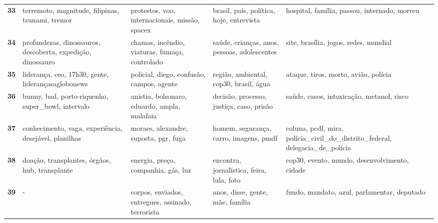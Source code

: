 \begin{xltabular}{\textwidth}{@{}l >{\RaggedRight\arraybackslash}X >{\RaggedRight\arraybackslash}X >{\RaggedRight\arraybackslash}X >{\RaggedRight\arraybackslash}X@{}}
    \textbf{33} & terremoto, magnitude, filipinas, tsunami, tremor & protestos, voo, internacionais, missão, spacex & brasil, país, política, hoje, entrevista & hospital, família, passou, internado, morreu \\
    \textbf{34} & profundezas, dinossauros, descoberta, expedição, dinossauro & chamas, incêndio, viaturas, fumaça, controlado & saúde, crianças, anos, pessoas, adolescentes & site, brasília, jogos, redes, mundial \\
    \textbf{35} & liderança, ceo, 17h30, gente, liderançasaglobonews & policial, diego, confusão, campos, agente & região, ambiental, cop30, brasil, água & ataque, tiros, morto, avião, polícia \\
    \textbf{36} & bunny, bad, porto-riquenho, super\_bowl, intervalo & anistia, bolsonaro, eduardo, ampla, malafaia & decisão, processo, justiça, caso, prisão & saúde, casos, intoxicação, metanol, risco \\
    \textbf{37} & conhecimento, vaga, experiência, desejável, planilhas & moraes, alexandre, suposta, pgr, fuga & homem, segurança, carro, imagens, pmdf & coluna, pcdf, mira, polícia\_civil\_do\_distrito\_federal, delegacia\_de\_polícia \\
    \textbf{38} & doação, transplantes, órgãos, hub, transplante & energia, preço, companhia, gás, luz & encontra, jornalística, feira, lula, foto & cop30, evento, mundo, desenvolvimento, cidade \\
    \textbf{39} & - & corpos, enviados, entregues, assinado, terrorista & anos, disse, gente, mãe, família & fundo, mandato, azul, parlamentar, deputado \\
\end{xltabular}
\endgroup
